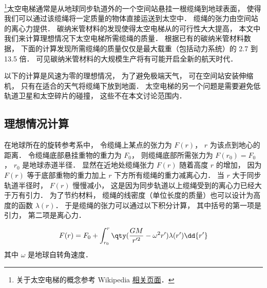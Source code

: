 

\footnote{关于太空电梯的概念参考 Wikipedia \href{https://en.wikipedia.org/wiki/Space_elevator}{相关页面}．}太空电梯通常是从地球同步轨道外的一个空间站悬挂一根缆绳到地球表面， 使得我们可以通过该缆绳将一定质量的物体直接运送到太空中． 缆绳的张力由空间站的离心力提供． 碳纳米管材料的发现使得太空电梯从的可行性大大提高， 本文中我们来计算理想情况下太空电梯所需缆绳的质量． 根据已有的碳纳米管材料数据， 下面的计算发现所需缆绳的质量仅仅是最大载重（包括动力系统）的 2.7 到 13.5 倍． 可见碳纳米管材料的大规模生产将有可能开启全新的航天时代．

以下的计算是风速为零的理想情况， 为了避免极端天气， 可在空间站安装伸缩机， 只有在适合的天气将缆绳下放到地面． 太空电梯的另一个问题是需要避免低轨道卫星和太空碎片的碰撞， 这些不在本文讨论范围内．

\subsection{理想情况计算}
在地球所在的旋转参考系中， 令缆绳上某点的张力为 $F(r)$， $r$ 为该点到地心的距离． 令缆绳底部悬挂重物的重力为 $F_0$， 则缆绳底部所需张力为 $F(r_0) = F_0$， $r_0$ 是地球赤道半径． 显然在近地处缆绳张力 $F(r)$ 随着高度 $r$ 的增加， 因为 $F(r)$ 等于底部重物的重力加上 $r$ 下方所有缆绳的重力减离心力． 当 $r$ 大于同步轨道半径时， $F(r)$ 慢慢减小， 这是因为同步轨道以上缆绳受到的离心力已经大于万有引力． 为了节约材料， 缆绳的线密度（单位长度的质量）也可以设计为高度的函数 $\lambda(r)$． 于是缆绳的张力可以通过以下积分计算， 其中括号的第一项是引力， 第二项是离心力．

\begin{equation}\label{SpcLad_eq1}
F(r) = F_0 + \int_{r_0}^{r} \qty(\frac{GM}{r'^2} - \omega^2 r') \lambda(r') \dd{r'}
\end{equation}
其中 $\omega$ 是地球自转角速度．

